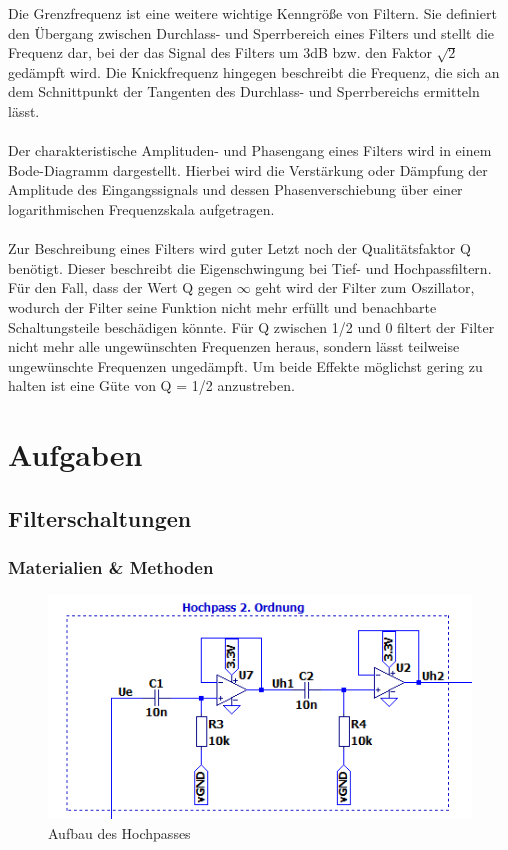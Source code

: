 Die Grenzfrequenz ist eine weitere wichtige Kenngröße von Filtern. Sie definiert den Übergang zwischen Durchlass- und Sperrbereich eines Filters und stellt die Frequenz dar, bei der das Signal des Filters um 3dB bzw. den Faktor $\sqrt{2}$ gedämpft wird.
Die Knickfrequenz hingegen beschreibt die Frequenz, die sich an dem Schnittpunkt der Tangenten des Durchlass- und Sperrbereichs ermitteln lässt.
\\
\\
Der charakteristische Amplituden- und Phasengang eines Filters wird in einem Bode-Diagramm dargestellt. Hierbei wird die Verstärkung oder Dämpfung der Amplitude des Eingangssignals und dessen Phasenverschiebung über einer logarithmischen Frequenzskala aufgetragen.
\\
\\
Zur Beschreibung eines Filters wird guter Letzt noch der Qualitätsfaktor Q benötigt. Dieser beschreibt die Eigenschwingung bei Tief- und Hochpassfiltern. Für den Fall, dass der Wert Q gegen $\infty$ geht wird der Filter zum Oszillator, wodurch der Filter seine Funktion nicht mehr erfüllt und benachbarte Schaltungsteile beschädigen könnte. Für Q zwischen 1/2 und 0 filtert der Filter nicht mehr alle ungewünschten Frequenzen heraus, sondern lässt teilweise ungewünschte Frequenzen ungedämpft. Um beide Effekte möglichst gering zu halten ist eine Güte von Q = 1/2 anzustreben.

\clearpage
\section{Aufgaben}

\subsection{Filterschaltungen}

\subsubsection{Materialien \& Methoden}

\begin{figure}[htb]
    \includegraphics[width=14cm]{./pictures/Hochpass}
    \caption{Aufbau des Hochpasses}
    \label{fig:Hochpass}
\end{figure}

